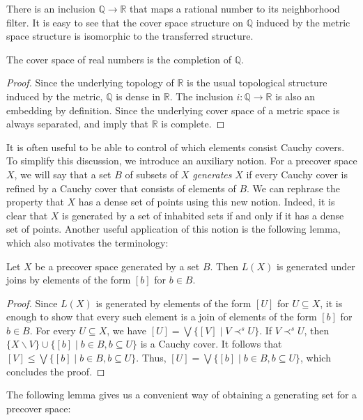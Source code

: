 \documentclass[reqno]{amsart}
\theoremstyle{definition}
\theoremstyle{remark}
\numberwithin{figure}{section}
\newcommand{\rb}{\prec}
\begin{document}
There is an inclusion $\mathbb{Q} \to \mathbb{R}$ that maps a rational number to its neighborhood filter.
It is easy to see that the cover space structure on $\mathbb{Q}$ induced by the metric space structure is isomorphic to the transferred structure.

\begin{prop}
The cover space of real numbers is the completion of $\mathbb{Q}$.
\end{prop}
\begin{proof}
Since the underlying topology of $\mathbb{R}$ is the usual topological structure induced by the metric, $\mathbb{Q}$ is dense in $\mathbb{R}$.
The inclusion $i : \mathbb{Q} \to \mathbb{R}$ is also an embedding by definition.
Since the underlying cover space of a metric space is always separated,  and  imply that $\mathbb{R}$ is complete.
\end{proof}

It is often useful to be able to control of which elements consist Cauchy covers.
To simplify this discussion, we introduce an auxiliary notion.
For a precover space $X$, we will say that a set $B$ of subsets of $X$ \emph{generates} $X$ if every Cauchy cover is refined by a Cauchy cover that consists of elements of $B$.
We can rephrase the property that $X$ has a dense set of points using this new notion.
Indeed, it is clear that $X$ is generated by a set of inhabited sets if and only if it has a dense set of points.
Another useful application of this notion is the following lemma, which also motivates the terminology:

\begin{lem}
Let $X$ be a precover space generated by a set $B$.
Then $L(X)$ is generated under joins by elements of the form $[b]$ for $b \in B$.
\end{lem}
\begin{proof}
Since $L(X)$ is generated by elements of the form $[U]$ for $U \subseteq X$, it is enough to show that every such element is a join of elements of the form $[b]$ for $b \in B$.
For every $U \subseteq X$, we have $[U] = \bigvee \{ [V] \mid V \rb^s U \}$.
If $V \rb^s U$, then $\{ X \backslash V \} \cup \{ [b] \mid b \in B, b \subseteq U \}$ is a Cauchy cover.
It follows that $[V] \leq \bigvee \{ [b] \mid b \in B, b \subseteq U \}$.
Thus, $[U] = \bigvee \{ [b] \mid b \in B, b \subseteq U \}$, which concludes the proof.
\end{proof}

The following lemma gives us a convenient way of obtaining a generating set for a precover space:
\end{document}
